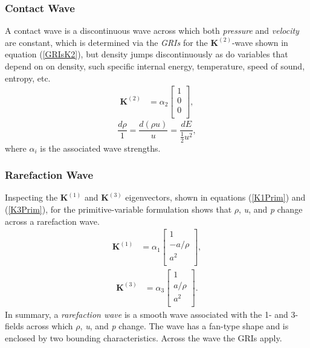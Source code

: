 \documentclass[]{article}
\begin{document}
		\subsubsection{Contact Wave}
			A contact wave is a discontinuous wave across which both \textit{pressure} and \textit{velocity} are constant, which is determined via the \textit{GRIs} for the $ \textbf{K}^{(2)} $-wave shown in equation (\ref{GRIsK2}), but density jumps discontinuously as do variables that depend on on density, such specific internal energy, temperature, speed of sound, entropy, etc.
			\begin{align}
				\textbf{K}^{(2)} &= \alpha_2 \begin{bmatrix}
				1 \\
				0 \\
				0 \\
				\end{bmatrix},
			\end{align}
			\begin{equation}
				\frac{d \rho}{1} = \frac{d(\rho u)}{u} = \frac{dE}{\frac{1}{2}u^2}
				\label{GRIsK2},
			\end{equation}
			where $ \alpha_i $ is the associated wave strengths.
			
		\subsubsection{Rarefaction Wave}		
			Inspecting the $ \textbf{K}^{(1)} $ and  $ \textbf{K}^{(3)} $ eigenvectors, shown in equations (\ref{K1Prim}) and (\ref{K3Prim}), for the primitive-variable formulation shows that $ \rho $, \textit{u}, and \textit{p} change across a rarefaction wave.
			\begin{align}
				\textbf{K}^{(1)} &= \alpha_1 \begin{bmatrix}
				1 \\
				-a/\rho \\
				a^2 \\
				\end{bmatrix},
				\label{K1Prim}
			\end{align}
			\begin{align}
				\textbf{K}^{(3)} &= \alpha_3 \begin{bmatrix}
				1 \\
				a/\rho \\
				a^2 \\
				\end{bmatrix}.
				\label{K3Prim}
			\end{align}
			In summary, a \textit{rarefaction wave} is a smooth wave associated with the 1- and 3-fields across which $ \rho $, \textit{u}, and \textit{p} change. The wave has a fan-type shape and is enclosed by two bounding characteristics. Across the wave the GRIs apply.
			
\end{document}

